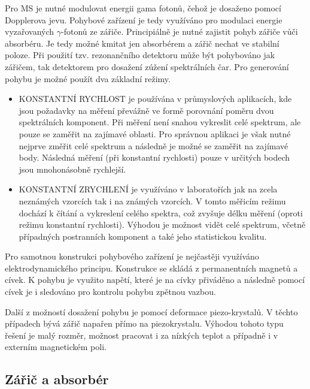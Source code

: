 \documentclass[../../main.tex]{subfiles}
\begin{document}
Pro MS je nutné modulovat energii gama fotonů, čehož je dosaženo pomocí Dopplerova jevu. Pohybové zařízení je tedy využíváno pro modulaci energie vyzařovaných $\gamma$-fotonů ze zářiče. Principiálně je nutné zajistit pohyb zářiče vůči absorbéru. Je tedy možné kmitat jen absorbérem a zářič nechat ve stabilní poloze. Při použití tzv. rezonančního detektoru může být pohybováno jak zářičem, tak detektorem pro dosažení zúžení spektrálních čar. Pro generování pohybu je možné použít dva základní režimy.

\begin{itemize}
	\item KONSTANTNÍ RYCHLOST je používána v průmyslových aplikacích, kde jsou požadavky na měření převážně ve formě porovnání poměru dvou spektrálních komponent. Při měření není snahou vykreslit celé spektrum, ale pouze se zaměřit na zajímavé oblasti. Pro správnou aplikaci je však nutné nejprve změřit celé spektrum a následně je možné se zaměřit na zajímavé body. Následná měření (při konstantní rychlosti) pouze v určitých bodech jsou mnohonásobně rychlejší. 
	
	\item KONSTANTNÍ ZRYCHLENÍ je využíváno v laboratořích jak na zcela neznámých vzorcích
	tak i na známých vzorcích. V tomto měřicím režimu dochází k čítání a vykreslení celého spektra, což zvyšuje délku měření (oproti režimu konstantní rychlosti). Výhodou je možnost vidět celé spektrum, včetně případných postranních komponent a také jeho statistickou kvalitu. 

\end{itemize}

Pro samotnou konstrukci pohybového zařízení je nejčastěji využíváno elektrodynamického principu. Konstrukce se skládá z permanentních magnetů a cívek. K pohybu je využito napětí, které je na cívky přiváděno a následně pomocí cívek je i sledováno pro kontrolu pohybu zpětnou vazbou. 

Další z možností dosažení pohybu je pomocí deformace piezo-krystalů. V těchto případech bývá zářič napařen přímo na piezokrystalu. Výhodou tohoto typu řešení je malý rozměr, možnost pracovat i za nízkých teplot a
případně i v externím magnetickém poli. 

\subsection{Zářič a absorbér}
\end{document}
